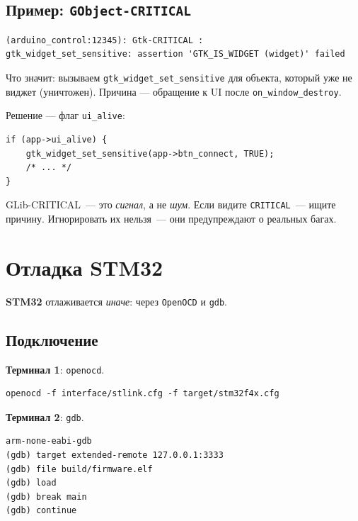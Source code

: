 \subsection{Пример: \texttt{GObject-CRITICAL}}

\begin{verbatim}
(arduino_control:12345): Gtk-CRITICAL :
gtk_widget_set_sensitive: assertion 'GTK_IS_WIDGET (widget)' failed
\end{verbatim}

Что значит: вызываем \texttt{gtk\_widget\_set\_sensitive}
для объекта, который уже не виджет
(уничтожен). Причина — обращение к UI
после \texttt{on\_window\_destroy}.

Решение — флаг \texttt{ui\_alive}:

\begin{listing}[htbp]
\begin{verbatim}
if (app->ui_alive) {
    gtk_widget_set_sensitive(app->btn_connect, TRUE);
    /* ... */
}
\end{verbatim}
\caption{Защита через \texttt{ui\_alive}}
\label{lst:debug-ui-alive}
\end{listing}

\begin{keybox}
GLib-CRITICAL~--- это \emph{сигнал}, а не \emph{шум}.
Если видите \texttt{CRITICAL}~--- ищите
причину. Игнорировать их нельзя~---
они предупреждают о реальных багах.
\end{keybox}

\section{Отладка STM32}
\label{sec:debug-stm32}

\textbf{STM32} отлаживается \emph{иначе}: через
\texttt{OpenOCD} и \texttt{gdb}.

\subsection{Подключение}

\textbf{Терминал 1}: \texttt{openocd}.

\begin{verbatim}
openocd -f interface/stlink.cfg -f target/stm32f4x.cfg
\end{verbatim}

\textbf{Терминал 2}: \texttt{gdb}.

\begin{verbatim}
arm-none-eabi-gdb
(gdb) target extended-remote 127.0.0.1:3333
(gdb) file build/firmware.elf
(gdb) load
(gdb) break main
(gdb) continue
\end{verbatim}

